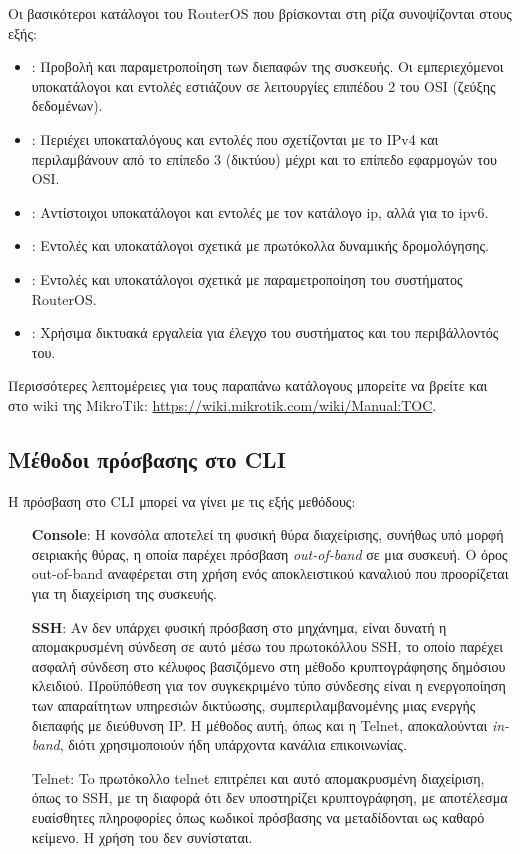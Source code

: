 \documentclass{EdipyLabs} %
\begin{document}
Οι βασικότεροι κατάλογοι του RouterOS που βρίσκονται στη ρίζα συνοψίζονται στους εξής:
\begin{itemize}
	\item {}: Προβολή και παραμετροποίηση των διεπαφών της συσκευής. Οι εμπεριεχόμενοι υποκατάλογοι και εντολές εστιάζουν σε λειτουργίες επιπέδου 2 του OSI (ζεύξης δεδομένων).
	\item {}: Περιέχει υποκαταλόγους και εντολές που σχετίζονται με το IPv4 και περιλαμβάνουν από το επίπεδο 3 (δικτύου) μέχρι και το επίπεδο εφαρμογών του OSI. 
	\item {}: Αντίστοιχοι υποκατάλογοι και εντολές με τον κατάλογο ip, αλλά για το ipv6. 
	\item {}: Εντολές και υποκατάλογοι σχετικά με πρωτόκολλα δυναμικής δρομολόγησης.
	\item {}: Εντολές και υποκατάλογοι σχετικά με παραμετροποίηση του συστήματος RouterOS.
	\item {}: Χρήσιμα δικτυακά εργαλεία για έλεγχο του συστήματος και του περιβάλλοντός του.
\end{itemize}

Περισσότερες λεπτομέρειες για τους παραπάνω κατάλογους μπορείτε να βρείτε και στο wiki της MikroTik: \url{https://wiki.mikrotik.com/wiki/Manual:TOC}.

\subsection{Μέθοδοι πρόσβασης στο CLI}
H πρόσβαση στο CLI μπορεί να γίνει με τις εξής μεθόδους:
\begin{itemize} 
	\item [\textbf{Console}:] Η κονσόλα αποτελεί τη φυσική θύρα διαχείρισης, συνήθως υπό μορφή σειριακής θύρας, η οποία παρέχει πρόσβαση \textit{out-of-band} σε μια συσκευή. Ο όρος out-of-band αναφέρεται στη χρήση ενός αποκλειστικού καναλιού που προορίζεται για τη διαχείριση της συσκευής.
	\item [\textbf{SSH}:] Αν δεν υπάρχει φυσική πρόσβαση στο μηχάνημα, είναι δυνατή η απομακρυσμένη σύνδεση σε αυτό μέσω του πρωτοκόλλου SSH, το οποίο παρέχει ασφαλή σύνδεση στο κέλυφος βασιζόμενο στη μέθοδο κρυπτογράφησης δημόσιου κλειδιού. Προϋπόθεση για τον συγκεκριμένο τύπο σύνδεσης είναι η ενεργοποίηση των απαραίτητων υπηρεσιών δικτύωσης, συμπεριλαμβανομένης μιας ενεργής διεπαφής με διεύθυνση IP. Η μέθοδος αυτή, όπως και η Telnet, αποκαλούνται \textit{in-band}, διότι χρησιμοποιούν ήδη υπάρχοντα κανάλια επικοινωνίας.
	\item [Telnet:] To πρωτόκολλο telnet επιτρέπει και αυτό απομακρυσμένη διαχείριση, όπως το SSH, με τη διαφορά ότι δεν υποστηρίζει κρυπτογράφηση, με αποτέλεσμα ευαίσθητες πληροφορίες όπως κωδικοί πρόσβασης να μεταδίδονται ως καθαρό κείμενο. Η χρήση του δεν συνίσταται.
\end{itemize}
\end{document}
